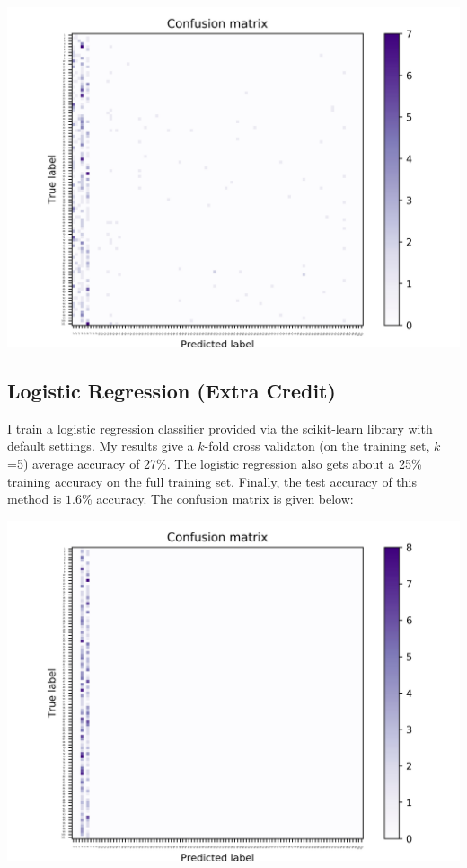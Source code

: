\documentclass[]{article}
\begin{document}
\includegraphics[scale=0.10]{bow_random_forest_confusion_results.jpg}


\subsection{Logistic Regression (Extra Credit)}

I train a logistic regression classifier provided via the scikit-learn library with default settings. My results give a $k$-fold cross validaton (on the training set, $k$ =5) average accuracy of 27\%. The logistic regression also gets about a 25\% training accuracy on the full training set. Finally, the test accuracy of this method is $1.6$\% accuracy. The confusion matrix is given below:

\includegraphics[scale=0.10]{bow_logistic_confusion_results.jpg}
\end{document}
